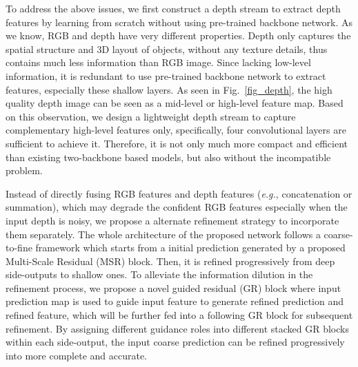 \documentclass[runningheads]{llncs}
\begin{document}
To address the above issues, we first construct a depth stream to extract depth features by learning from scratch without using pre-trained backbone network. As we know, RGB and depth have very different properties. Depth only captures the spatial structure and 3D layout of objects, without any texture details, thus contains much less information than RGB image. Since lacking low-level information, it is redundant to use pre-trained backbone network to extract features, especially these shallow layers. As seen in Fig.~\ref{fig_depth}, the high quality depth image can be seen as a mid-level or high-level feature map. Based on this observation, we design a lightweight depth stream to capture complementary high-level features only, specifically, four convolutional layers are sufficient to achieve it. Therefore, it is not only much more compact and efficient than existing two-backbone based models, but also without the incompatible problem.

Instead of directly fusing RGB features and depth features (\textit{e.g.}, concatenation or summation), which may degrade the confident RGB features especially when the input depth is noisy, we propose a alternate refinement strategy to incorporate them separately. The whole architecture of the proposed network follows a coarse-to-fine framework which starts from a initial prediction generated by a proposed Multi-Scale Residual (MSR) block. Then, it is refined progressively from deep side-outputs to shallow ones. To alleviate the information dilution in the refinement process, we propose a novel guided residual (GR) block where input prediction map is used to guide input feature to generate refined prediction and refined feature, which will be further fed into a following GR block for subsequent refinement. By assigning different guidance roles into different stacked GR blocks within each side-output, the input coarse prediction can be refined progressively into more complete and accurate.
\end{document}
